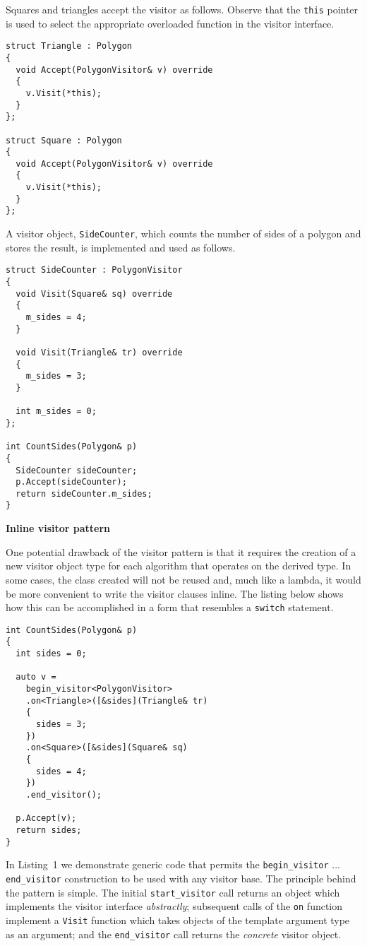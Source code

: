 \documentclass[10pt,a4paper,twocolumn]{article}
\renewcommand\section[1]{
    \begin{minipage}[c]{0.94\linewidth}
    \large \raggedright \sffamily \textbf{#1}
    \end{minipage}
}
\newcommand\mycode[1]{{\small\texttt{#1}}}
\begin{document}
Squares and triangles accept the visitor as follows. Observe that the \mycode{this} pointer is used to select the appropriate overloaded function in the visitor interface.

{\small\begin{verbatim}
struct Triangle : Polygon
{
  void Accept(PolygonVisitor& v) override
  {
    v.Visit(*this);
  }
};

struct Square : Polygon
{
  void Accept(PolygonVisitor& v) override
  {
    v.Visit(*this);
  }
};
\end{verbatim}}

A visitor object, \mycode{SideCounter}, which counts the number of sides of a polygon and stores the result, is implemented and used as follows.

{\small\begin{verbatim}
struct SideCounter : PolygonVisitor
{
  void Visit(Square& sq) override
  {
    m_sides = 4;
  }
  
  void Visit(Triangle& tr) override
  {
    m_sides = 3;
  }
  
  int m_sides = 0;
};

int CountSides(Polygon& p)
{
  SideCounter sideCounter;
  p.Accept(sideCounter);
  return sideCounter.m_sides;
}
\end{verbatim}}

\section{Inline visitor pattern}

One potential drawback of the visitor pattern is that it requires the creation  of a new visitor object type for each algorithm that operates on the derived type. In some cases, the class created will not be reused and, much like a lambda, it would be more convenient to write the visitor clauses inline. The listing below shows how this can be accomplished in a form that resembles a \mycode{switch} statement.

{\small\begin{verbatim}
int CountSides(Polygon& p)
{
  int sides = 0;
  
  auto v =
    begin_visitor<PolygonVisitor>
    .on<Triangle>([&sides](Triangle& tr)
    {
      sides = 3;
    })
    .on<Square>([&sides](Square& sq)
    {
      sides = 4;
    })
    .end_visitor();
  
  p.Accept(v);
  return sides;
}
\end{verbatim}}

In Listing~1 we demonstrate generic code that permits the \mycode{begin\_visitor} ... \mycode{end\_visitor} construction to be used with any visitor base. The principle behind the pattern is simple. The initial \mycode{start\_visitor} call returns an object which implements the visitor interface \emph{abstractly}; subsequent calls of the \mycode{on} function implement a \mycode{Visit} function which takes objects of the template argument type as an argument; and the \mycode{end\_visitor} call returns the \emph{concrete} visitor object.
\end{document}
